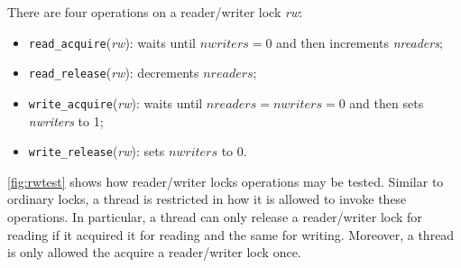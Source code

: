 \documentclass{report}
\begin{document}
There are four operations on a reader/writer lock \textit{rw}:
\begin{itemize}
\item \texttt{read\_acquire}(\textit{rw}): waits until $\mathit{nwriters} = 0$
and then increments \textit{nreaders};
\item \texttt{read\_release}(\textit{rw}): decrements $\mathit{nreaders}$;
\item \texttt{write\_acquire}(\textit{rw}): waits until
$\mathit{nreaders} = \mathit{nwriters} = 0$
and then sets \textit{nwriters} to 1;
\item \texttt{write\_release}(\textit{rw}): sets $\mathit{nwriters}$ to 0.
\end{itemize}

\autoref{fig:rwtest} shows how reader/writer locks operations
may be tested.
Similar to ordinary locks, a thread is restricted in how it is allowed to
invoke these operations.
In particular, a thread can only release a reader/writer lock for reading
if it acquired it for reading and the same for writing.
Moreover, a thread is only allowed the acquire a reader/writer lock once.
\end{document}

